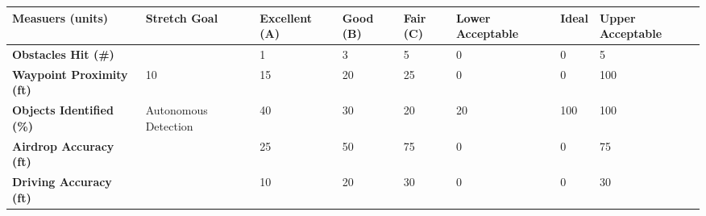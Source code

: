 \begin{table}[H]
	\centering
\begin{tabular}{|p{4.2cm}|p{2.1cm}|p{1.7cm}|p{1cm}|p{1cm}|p{1.7cm}|p{1cm}|p{1.7cm}|}
	\hline
\rowcolor[HTML]{C0C0C0}	
	{\color[HTML]{000000} \textbf{Measuers (units)}} & {\color[HTML]{000000}\textbf{Stretch Goal}} & {\color[HTML]{000000}\textbf{Excellent (A)}} & {\color[HTML]{000000}\textbf{Good (B)}} & {\color[HTML]{000000}\textbf{Fair (C)}} & {\color[HTML]{000000}\textbf{Lower Acceptable}} & {\color[HTML]{000000}\textbf{Ideal}} & {\color[HTML]{000000}\textbf{Upper Acceptable}} \\
	\hline
	\textbf{Obstacles Hit (\#)} & & 1 & 3 & 5 & 0 & 0 & 5 \\
	\hline
	\textbf{Waypoint Proximity (ft)} & 10 & 15 & 20 & 25 & 0 & 0 & 100 \\
	\hline
	\textbf{Objects Identified (\%)} & Autonomous Detection & 40 & 30 & 20 & 20 & 100 & 100 \\
	\hline
	\textbf{Airdrop Accuracy (ft)} & & 25 & 50 & 75 & 0 & 0 & 75 \\
	\hline
	\textbf{Driving Accuracy (ft)} & & 10 & 20 & 30 & 0 & 0 & 30 \\
	\hline
\end{tabular}
\end{table}
